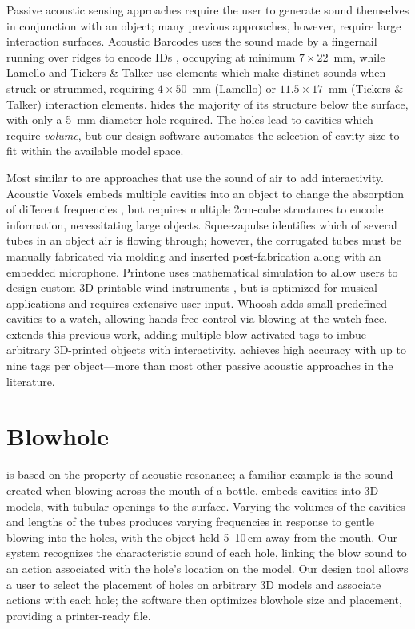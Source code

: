         Passive acoustic sensing approaches require the user to generate sound
        themselves in conjunction with an object; many previous approaches,
        however, require large interaction surfaces. Acoustic Barcodes uses the
        sound made by a fingernail running over ridges to encode IDs
        \cite{Harrison:2012kw}, occupying at minimum $7\times 22$~mm, while
        Lamello \cite{Savage:2015cs} and Tickers \& Talker \cite{Shi:2016ff} use
        elements which make distinct sounds when struck or strummed, requiring
        $4\times 50$~mm (Lamello) or $11.5\times 17$~mm (Tickers \& Talker)
        interaction elements. \bh hides the majority of its structure below the
        surface, with only a 5~mm diameter hole required. The holes lead to
        cavities which require \textit{volume}, but our design software
        automates the selection of cavity size to fit within the available model
        space.
        
        Most similar to \bh are approaches that use the sound of air
				to add interactivity. Acoustic Voxels embeds multiple cavities
				into an object to change the absorption of different
				frequencies \cite{Li:2016bt}, but requires multiple 2cm-cube
				structures to encode information, necessitating large objects.
				Squeezapulse \cite{He:2017jc} identifies which of several
				tubes in an object air is flowing through; however, the
				corrugated tubes must be manually fabricated via molding and
				inserted post-fabrication along with an embedded microphone.
				Printone uses mathematical simulation to allow users to design
				custom 3D-printable wind instruments \cite{Umetani:2016es},
				but is optimized for musical applications and requires
				extensive user input. Whoosh \cite{Reyes:2016iy} adds small
				predefined cavities to a watch, allowing hands-free control
				via blowing at the watch face. \bh extends this previous work,
				adding multiple blow-activated tags to imbue arbitrary
				3D-printed objects with interactivity. \bh achieves high
				accuracy with up to nine tags per object---more than most
				other passive acoustic approaches in the literature.

  \section{Blowhole}
    \bh is based on the property of acoustic resonance; a familiar example is
    the sound created when blowing across the mouth of a bottle. \bh embeds
    cavities into 3D models, with tubular openings to the surface. Varying the
    volumes of the cavities and lengths of the tubes produces varying
    frequencies in response to gentle blowing into the holes, with the object
    held 5--10\,cm away from the mouth. Our system recognizes the characteristic
    sound of each hole, linking the blow sound to an action associated with the
    hole's location on the model. Our design tool allows a user to select the
    placement of holes on arbitrary 3D models and associate actions with each
    hole; the software then optimizes blowhole size and placement, providing a
    printer-ready file.
    
